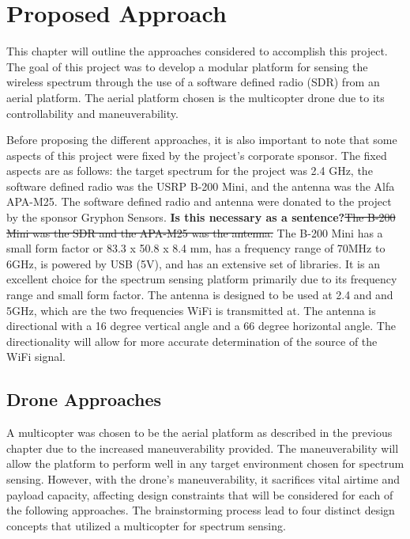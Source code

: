 \chapter{Proposed Approach}
This chapter will outline the approaches considered to accomplish this project. The goal of this project was to develop a modular platform for sensing the wireless spectrum through the use of a software defined radio (SDR) from an aerial platform. The aerial platform chosen is the multicopter drone due to its controllability and maneuverability. \par

Before proposing the different approaches, it is also important to note that some aspects of this project were fixed by the project’s corporate sponsor. The fixed aspects are as follows: the target spectrum for the project was 2.4 GHz, the software defined radio was the USRP B-200 Mini, and the antenna was the Alfa APA-M25. The software defined radio and antenna were donated to the project by the sponsor Gryphon Sensors. \textbf{Is this necessary as a sentence?}\sout{The B-200 Mini was the SDR and the APA-M25 was the antenna.} The B-200 Mini has a small form factor or 83.3 x 50.8 x 8.4 mm, has a frequency range of 70MHz to 6GHz, is powered by USB (5V), and has an extensive set of libraries. It is an excellent choice for the spectrum sensing platform primarily due to its frequency range and small form factor. The antenna is designed to be used at 2.4 and and 5GHz, which are the two frequencies WiFi is transmitted at. The antenna is directional with a 16 degree vertical angle and a 66 degree horizontal angle. The directionality will allow for more accurate determination of the source of the WiFi signal.

\section{Drone Approaches}
A multicopter was chosen to be the aerial platform as described in the previous chapter due to the increased maneuverability provided. The maneuverability will allow the platform to perform well in any target environment chosen for spectrum sensing. However, with the drone’s maneuverability, it sacrifices vital airtime and payload capacity, affecting design constraints that will be considered for each of the following approaches. The brainstorming process lead to four distinct design concepts that utilized a multicopter for spectrum sensing. \par

